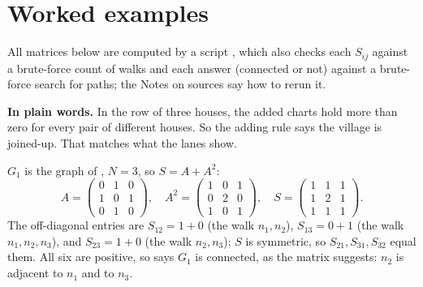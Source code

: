 \section{Worked examples}\label{sec:examples}

All matrices below are computed by a script \cite{m2_connectivity_script}, which also checks each $S_{ij}$ against a brute-force count of walks and each answer (connected or not) against a brute-force search for paths; the Notes on sources say how to rerun it.

\plainstart\textbf{In plain words.} In the row of three houses, the added charts hold more than zero for every pair of different houses. So the adding rule says the village is joined-up. That matches what the lanes show.\plainend
\begin{example}\label{ex:test1}
$G_1$ is the graph of , $N = 3$, so $S = A + A^2$:
\[
A = \begin{pmatrix} 0&1&0\\ 1&0&1\\ 0&1&0 \end{pmatrix},\quad
A^2 = \begin{pmatrix} 1&0&1\\ 0&2&0\\ 1&0&1 \end{pmatrix},\quad
S = \begin{pmatrix} 1&1&1\\ 1&2&1\\ 1&1&1 \end{pmatrix}.
\]
The off-diagonal entries are $S_{12} = 1 + 0$ (the walk $n_1, n_2$), $S_{13} = 0 + 1$ (the walk $n_1, n_2, n_3$), and $S_{23} = 1 + 0$ (the walk $n_2, n_3$); $S$ is symmetric, so $S_{21}, S_{31}, S_{32}$ equal them. All six are positive, so  says $G_1$ is connected, as the matrix suggests: $n_2$ is adjacent to $n_1$ and to $n_3$.
\end{example}


